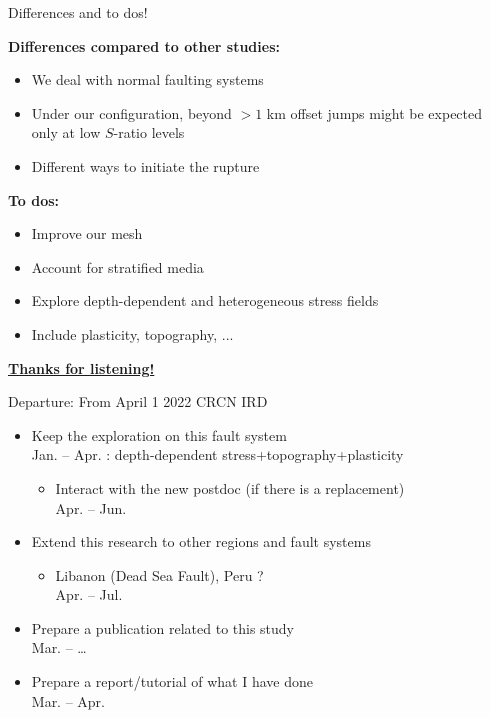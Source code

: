 \documentclass{beamer}
\begin{document}
\begin{frame}
 {Differences and to dos!}

 {\bf Differences compared to other studies:}
 \begin{itemize}
  \item \footnotesize We deal with normal faulting systems
  \item \footnotesize Under our configuration, beyond $>1$ km offset jumps might be expected only at low $S$-ratio levels
  \item \footnotesize Different ways to initiate the rupture
 \end{itemize}

 {\bf To dos:}
 \begin{itemize}
  \item \footnotesize Improve our mesh \Checkmark 
  \item \footnotesize Account for stratified media \Checkmark
  \item \footnotesize Explore depth-dependent and heterogeneous stress fields
  \item \footnotesize Include plasticity, topography, ...
 \end{itemize}
 
 \begin{center}
   \underline{\bf Thanks for listening!}  
 \end{center}

\end{frame}

\begin{frame}
 {Departure: From April 1 2022 CRCN IRD}
 
 \begin{itemize}
  \item Keep the exploration on this fault system \\
        Jan. -- Apr. : depth-dependent stress+topography+plasticity 
        \vskip 0.4cm
  \begin{itemize}
   \item Interact with the new postdoc (if there is a replacement) \\
         Apr. -- Jun.
  \end{itemize}
  \vskip 0.4cm
  \item Extend this research to other regions and fault systems
  \begin{itemize}
   \item Libanon (Dead Sea Fault), Peru ? \\
         Apr. -- Jul.
  \end{itemize}
  \vskip 0.4cm
  \item Prepare a publication related to this study \\
        Mar. -- \dots
  \vskip 0.4cm
  \item Prepare a report/tutorial of what I have done \\
        Mar. -- Apr.
 \end{itemize}

 
 
\end{frame}
\end{document}
